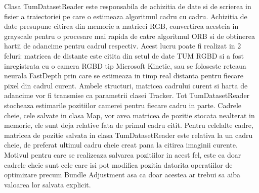 \documentclass[12pt,a4paper]{report}
\begin{document}
Clasa TumDatasetReader este responsabila de achizitia de date si de scrierea 
in fisier a traiectoriei pe care o estimeaza algoritmul cadru cu cadru. Achizitia de date 
presupune citirea din memorie a matricei RGB, convertirea acesteia in grayscale pentru 
o procesare mai rapida de catre algoritmul ORB si de obtinerea hartii de adancime pentru 
cadrul respectiv. Acest lucru poate fi realizat in 2 feluri: matricea de distante este citita
din setul de date TUM RGBD si a fost inregistrata cu o camera RGBD tip Microsoft Kinetic,
sau se foloseste reteaua neurala FastDepth prin care se estimeaza in timp real distanta pentru
fiecare pixel din cadrul curent. Ambele structuri, matricea cadrului curent si harta de adancime
vor fi transmise ca parametrii clasei Tracker. Tot TumDatasetReader stocheaza estimarile 
pozitiilor camerei pentru fiecare cadru in parte. Cadrele cheie, cele salvate 
in clasa Map, vor avea matricea de pozitie stocata nealterat in memorie, ele sunt deja relative 
fata de primul cadru citit. Pentru celelalte cadre, matricea de pozitie salvata in clasa
TumDatasetReader este relativa la un cadru cheie, de preferat ultimul cadru cheie creat pana
la citirea imaginii curente. Motivul pentru care se realizeaza salvarea pozitiilor in acest 
fel, este ca doar cadrele cheie sunt cele care isi pot modifica pozitia datorita operatiilor 
de optimizare precum Bundle Adjustment asa ca doar acestea ar trebui sa aiba valoarea lor 
salvata explicit. \\
\end{document}
